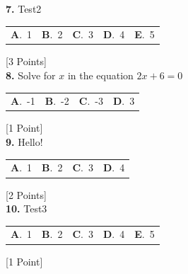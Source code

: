 \documentclass[12pt]{article}
\newcommand{\choice}[2]{\textbf{#1}.~#2}
\begin{document}
\noindent \textbf{\textenglish{7.}} {\textenglish{Test2}}

\begin{tabularx}{\linewidth}{@{}*{5}{Y}@{}}
\choice{A}{{{\textenglish{1}}}} & \choice{B}{{{\textenglish{2}}}} & \choice{C}{{{\textenglish{3}}}} & \choice{D}{{{\textenglish{4}}}} & \choice{E}{{{\textenglish{5}}}} \\
\end{tabularx}
\hfill {\textenglish{[3 Points]}}\\[0.5em]

\noindent \textbf{\textenglish{8.}} {\textenglish{Solve for }}\(x \){\textenglish{ in the equation }}\(2x+6 = 0 \)

\begin{tabularx}{\linewidth}{@{}*{4}{Y}@{}}
\choice{A}{{{\textenglish{-1}}}} & \choice{B}{{{\textenglish{-2}}}} & \choice{C}{{{\textenglish{-3}}}} & \choice{D}{{{\textenglish{3}}}} \\
\end{tabularx}
\hfill {\textenglish{[1 Point]}}\\[0.5em]

\noindent \textbf{\textenglish{9.}} {\textenglish{Hello!}}

\begin{tabularx}{\linewidth}{@{}*{4}{Y}@{}}
\choice{A}{{{\textenglish{1}}}} & \choice{B}{{{\textenglish{2}}}} & \choice{C}{{{\textenglish{3}}}} & \choice{D}{{{\textenglish{4}}}} \\
\end{tabularx}
\hfill {\textenglish{[2 Points]}}\\[0.5em]

\noindent \textbf{\textenglish{10.}} {\textenglish{Test3}}

\begin{tabularx}{\linewidth}{@{}*{5}{Y}@{}}
\choice{A}{{{\textenglish{1}}}} & \choice{B}{{{\textenglish{2}}}} & \choice{C}{{{\textenglish{3}}}} & \choice{D}{{{\textenglish{4}}}} & \choice{E}{{{\textenglish{5}}}} \\
\end{tabularx}
\hfill {\textenglish{[1 Point]}}\\[0.5em]
\end{document}
